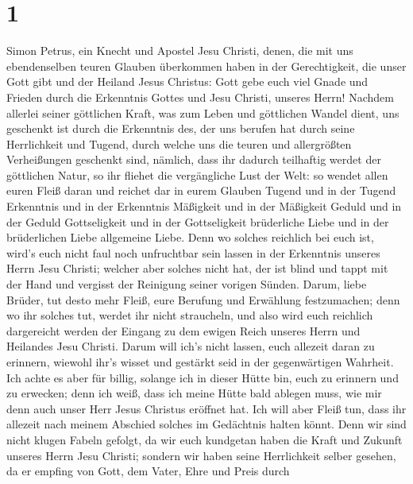 \hypertarget{section}{%
\section{1}\label{section}}

 Simon Petrus, ein Knecht und Apostel Jesu Christi, denen,
die mit uns ebendenselben teuren Glauben überkommen haben in der
Gerechtigkeit, die unser Gott gibt und der Heiland Jesus Christus:
 Gott gebe euch viel Gnade und Frieden durch die Erkenntnis
Gottes und Jesu Christi, unseres Herrn!  Nachdem allerlei
seiner göttlichen Kraft, was zum Leben und göttlichen Wandel dient, uns
geschenkt ist durch die Erkenntnis des, der uns berufen hat durch seine
Herrlichkeit und Tugend,  durch welche uns die teuren und
allergrößten Verheißungen geschenkt sind, nämlich, dass ihr dadurch
teilhaftig werdet der göttlichen Natur, so ihr fliehet die vergängliche
Lust der Welt:  so wendet allen euren Fleiß daran und
reichet dar in eurem Glauben Tugend und in der Tugend Erkenntnis
 und in der Erkenntnis Mäßigkeit und in der Mäßigkeit Geduld
und in der Geduld Gottseligkeit  und in der Gottseligkeit
brüderliche Liebe und in der brüderlichen Liebe allgemeine Liebe.
 Denn wo solches reichlich bei euch ist, wird's euch nicht
faul noch unfruchtbar sein lassen in der Erkenntnis unseres Herrn Jesu
Christi;  welcher aber solches nicht hat, der ist blind und
tappt mit der Hand und vergisst der Reinigung seiner vorigen Sünden.
 Darum, liebe Brüder, tut desto mehr Fleiß, eure Berufung
und Erwählung festzumachen; denn wo ihr solches tut, werdet ihr nicht
straucheln,  und also wird euch reichlich dargereicht
werden der Eingang zu dem ewigen Reich unseres Herrn und Heilandes Jesu
Christi.  Darum will ich's nicht lassen, euch allezeit
daran zu erinnern, wiewohl ihr's wisset und gestärkt seid in der
gegenwärtigen Wahrheit.  Ich achte es aber für billig,
solange ich in dieser Hütte bin, euch zu erinnern und zu erwecken;
 denn ich weiß, dass ich meine Hütte bald ablegen muss, wie
mir denn auch unser Herr Jesus Christus eröffnet hat.  Ich
will aber Fleiß tun, dass ihr allezeit nach meinem Abschied solches im
Gedächtnis halten könnt.  Denn wir sind nicht klugen Fabeln
gefolgt, da wir euch kundgetan haben die Kraft und Zukunft unseres Herrn
Jesu Christi; sondern wir haben seine Herrlichkeit selber gesehen,
 da er empfing von Gott, dem Vater, Ehre und Preis durch

